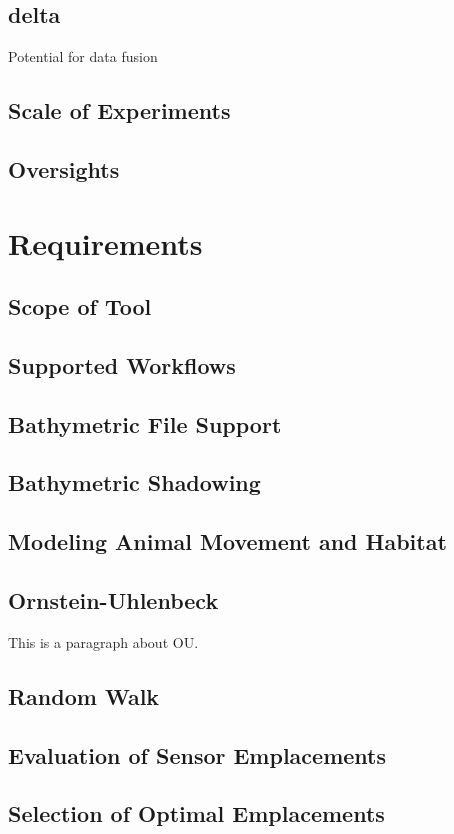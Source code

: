 \subsection{delta}
Potential for data fusion

\subsection{Scale of Experiments}

\subsection{Oversights}

\section{Requirements}
\subsection{Scope of Tool}
\subsection{Supported Workflows}
\subsection{Bathymetric File Support}
\subsection{Bathymetric Shadowing}
\subsection{Modeling Animal Movement and Habitat}
\subsection{Ornstein-Uhlenbeck}
This is a paragraph about OU.
\subsection{Random Walk}
\subsection{Evaluation of Sensor Emplacements}
\subsection{Selection of Optimal Emplacements}


